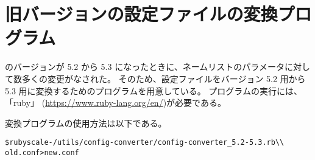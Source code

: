 \section{旧バージョンの設定ファイルの変換プログラム}

\scalelib のバージョンが 5.2 から 5.3 になったときに、ネームリストのパラメータに対して数多くの変更がなされた。
そのため、設定ファイルをバージョン 5.2 用から 5.3 用に変換するためのプログラムを用意している。
プログラムの実行には、「ruby」 (\url{https://www.ruby-lang.org/en/})が必要である。

変換プログラムの使用方法は以下である。\\
\begin{alltt}
 \$ ruby scale-{\version}/utils/config-converter/config-converter_5.2-5.3.rb \verb|\\|
        old.conf > new.conf
\end{alltt}
